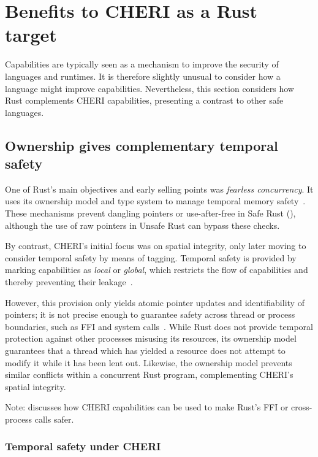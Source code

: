 \documentclass[dissertation.tex]{subfiles}
\begin{document}
\section{Benefits to CHERI as a Rust target}
\label{sec:eval-cheri}

Capabilities are typically seen as a mechanism to improve the security
of languages and runtimes.
It is therefore slightly unusual to consider how a language might
improve capabilities.
Nevertheless, this section considers how Rust complements CHERI
capabilities, presenting a contrast to other safe languages.

\subsection{Ownership gives complementary temporal safety}
\label{sec:eval-cheri-spatial-temporal}

One of Rust's main objectives and early selling points was
\emph{fearless concurrency}.
It uses its ownership model and type system to manage temporal memory
safety~\cite{rust-trpl-book}.
These mechanisms prevent dangling pointers or use-after-free in Safe
Rust (), although the use of raw pointers in
Unsafe Rust can bypass these checks.

By contrast, CHERI's initial focus was on spatial integrity, only later
moving to consider temporal safety by means of tagging.
Temporal safety is provided by marking capabilities as \emph{local} or
\emph{global}, which restricts the flow of capabilities and thereby
preventing their leakage~\cite{cheri2015}.

However, this provision only yields atomic pointer updates and
identifiability of pointers;
it is not precise enough to guarantee safety across thread or process
boundaries, such as FFI and system calls~\cite{cheri-2019-abstract}.
While Rust does not provide temporal protection against other processes
misusing its resources, its ownership model guarantees that a thread
which has yielded a resource does not attempt to modify it while it has
been lent out.
Likewise, the ownership model prevents similar conflicts within a
concurrent Rust program, complementing CHERI's spatial integrity.

Note:  discusses how CHERI capabilities can
be used to make Rust's FFI or cross-process calls safer.

\subsubsection{Temporal safety under CHERI}
\end{document}
